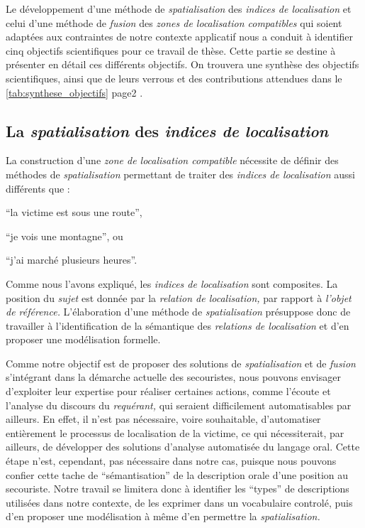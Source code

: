 Le développement d'une méthode de \emph{spatialisation} des
\emph{indices de localisation} et celui d'une méthode de \emph{fusion}
des \emph{zones de localisation compatibles} qui soient adaptées aux
contraintes de notre contexte applicatif nous a conduit à identifier
cinq objectifs scientifiques pour ce travail de thèse. Cette partie se
destine à présenter en détail ces différents objectifs.
On trouvera une synthèse des objectifs scientifiques, ainsi que de
leurs verrous et des contributions attendues dans le
\autoref{tab:synthese_objectifs} page2
\pageref{tab:synthese_objectifs}.

\subsection{La \emph{spatialisation} des \emph{indices de
    localisation}}
\label{subsec:2-1-1}

La construction d'une \emph{zone de localisation compatible} nécessite
de définir des méthodes de \emph{spatialisation} permettant de traiter
des \emph{indices de localisation} aussi différents que :
%
\begin{enumerate*}[label=(\alph*)]
\item \enquote{la victime est sous une route},
\item \enquote{je vois une montagne}, ou
\item \enquote{j'ai marché plusieurs heures}.
\end{enumerate*}
%
Comme nous l'avons expliqué, les \emph{indices de localisation} sont
composites. La position du \emph{sujet} est donnée par la
\emph{relation de localisation,} par rapport à \emph{l'objet de
  référence.} L'élaboration d'une méthode de \emph{spatialisation}
présuppose donc de travailler à l'identification de la sémantique des
\emph{relations de localisation} et d'en proposer une modélisation
formelle.

Comme notre objectif est de proposer des solutions de
\emph{spatialisation} et de \emph{fusion} s'intégrant dans la démarche
actuelle des secouristes, nous pouvons envisager d'exploiter leur
expertise pour réaliser certaines actions, comme l'écoute et l'analyse
du discours du \emph{requérant,} qui seraient difficilement
automatisables par ailleurs. En effet, il n'est pas nécessaire, voire
souhaitable, d'automatiser entièrement le processus de localisation de
la victime, ce qui nécessiterait, par ailleurs, de développer des
solutions d'analyse automatisée du langage oral. Cette étape n'est,
cependant, pas nécessaire dans notre cas, puisque nous pouvons confier
cette tache de \enquote{sémantisation} de la description orale d'une
position au secouriste. Notre travail se limitera donc à identifier
les \enquote{types} de descriptions utilisées dans notre contexte, de
les exprimer dans un vocabulaire controlé, puis d'en proposer une
modélisation à même d'en permettre la \emph{spatialisation.}

